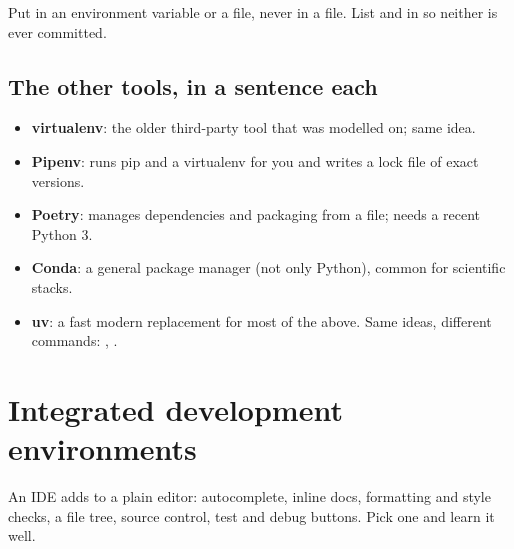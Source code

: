 \begin{gamerule}
Put  in an environment variable or a  file, never in a  file.
List  and  in  so neither is ever committed.
\end{gamerule}

\subsection{The other tools, in a sentence each}

\begin{itemize}[leftmargin=*,itemsep=1pt]
\item \textbf{virtualenv}: the older third-party tool that  was modelled on; same idea.
\item \textbf{Pipenv}: runs pip and a virtualenv for you and writes a lock file of exact versions.
\item \textbf{Poetry}: manages dependencies and packaging from a  file; needs a recent Python 3.
\item \textbf{Conda}: a general package manager (not only Python), common for scientific stacks.
\item \textbf{uv}: a fast modern replacement for most of the above. Same ideas, different commands:
  , .
\end{itemize}

\section{Integrated development environments}

An IDE adds to a plain editor: autocomplete, inline docs, formatting and style checks, a file tree, source control,
test and debug buttons. Pick one and learn it well.

